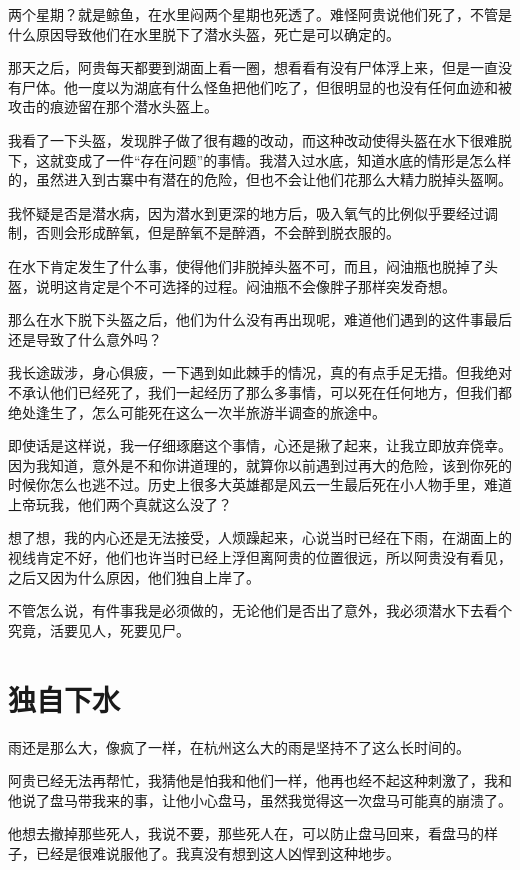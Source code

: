两个星期？就是鲸鱼，在水里闷两个星期也死透了。难怪阿贵说他们死了，不管是什么原因导致他们在水里脱下了潜水头盔，死亡是可以确定的。

那天之后，阿贵每天都要到湖面上看一圈，想看看有没有尸体浮上来，但是一直没有尸体。他一度以为湖底有什么怪鱼把他们吃了，但很明显的也没有任何血迹和被攻击的痕迹留在那个潜水头盔上。

我看了一下头盔，发现胖子做了很有趣的改动，而这种改动使得头盔在水下很难脱下，这就变成了一件“存在问题”的事情。我潜入过水底，知道水底的情形是怎么样的，虽然进入到古寨中有潜在的危险，但也不会让他们花那么大精力脱掉头盔啊。

我怀疑是否是潜水病，因为潜水到更深的地方后，吸入氧气的比例似乎要经过调制，否则会形成醉氧，但是醉氧不是醉酒，不会醉到脱衣服的。

在水下肯定发生了什么事，使得他们非脱掉头盔不可，而且，闷油瓶也脱掉了头盔，说明这肯定是个不可选择的过程。闷油瓶不会像胖子那样突发奇想。

那么在水下脱下头盔之后，他们为什么没有再出现呢，难道他们遇到的这件事最后还是导致了什么意外吗？

我长途跋涉，身心俱疲，一下遇到如此棘手的情况，真的有点手足无措。但我绝对不承认他们已经死了，我们一起经历了那么多事情，可以死在任何地方，但我们都绝处逢生了，怎么可能死在这么一次半旅游半调查的旅途中。

即使话是这样说，我一仔细琢磨这个事情，心还是揪了起来，让我立即放弃侥幸。因为我知道，意外是不和你讲道理的，就算你以前遇到过再大的危险，该到你死的时候你怎么也逃不过。历史上很多大英雄都是风云一生最后死在小人物手里，难道上帝玩我，他们两个真就这么没了？

想了想，我的内心还是无法接受，人烦躁起来，心说当时已经在下雨，在湖面上的视线肯定不好，他们也许当时已经上浮但离阿贵的位置很远，所以阿贵没有看见，之后又因为什么原因，他们独自上岸了。

不管怎么说，有件事我是必须做的，无论他们是否出了意外，我必须潜水下去看个究竟，活要见人，死要见尸。

\chapter{独自下水}

雨还是那么大，像疯了一样，在杭州这么大的雨是坚持不了这么长时间的。

阿贵已经无法再帮忙，我猜他是怕我和他们一样，他再也经不起这种刺激了，我和他说了盘马带我来的事，让他小心盘马，虽然我觉得这一次盘马可能真的崩溃了。

他想去撤掉那些死人，我说不要，那些死人在，可以防止盘马回来，看盘马的样子，已经是很难说服他了。我真没有想到这人凶悍到这种地步。

